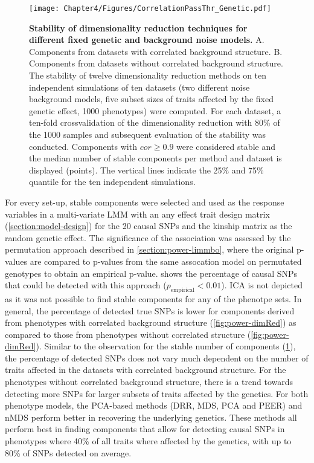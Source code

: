 \begin{figure}[hbtp]
	\centering
	\texttt{[image: Chapter4/Figures/CorrelationPassThr\_Genetic.pdf]}
\caption[\textbf{Stability of dimensionality reduction techniques for different fixed genetic and background noise models.}]{\textbf{Stability of dimensionality reduction techniques for different fixed genetic and background noise models. }A. Components from datasets with correlated background structure. B. Components from datasets without correlated background structure. The stability of twelve dimensionality reduction methods on ten independent simulations of ten datasets (two different noise background models, five subset sizes of traits affected by the fixed genetic effect, \num{1000} phenotypes) were computed.  For each dataset, a ten-fold crossvalidation of the dimensionality reduction with \num{80}\% of the \num{1000} samples and subsequent evaluation of the stability was conducted. Components with \(cor \ge 0.9\) were considered stable and the median number of stable components per method and dataset is displayed (points). The vertical lines indicate the \num{25}\% and \num{75}\% quantile for the ten independent simulations. } 
	 	\label{fig:cor-genetic}
\end{figure}

For every set-up, stable components were selected and used as the response variables in a multi-variate LMM with an any effect trait design matrix (\cref{section:model-design}) for the \num{20} causal SNPs and the kinship matrix as the random genetic effect. The significance of the association was assessed by the permutation approach described in \cref{section:power-limmbo}, where the original p-values are compared to p-values from the same assocation model on permutated genotypes to obtain an empirical p-value.  shows the percentage of causal SNPs that could be detected with this approach (\(p_\text{empirical} < 0.01\)). ICA is not depicted as it was not possible to find stable components for any of the phenotpe sets.  In general, the percentage of detected true SNPs is lower for components derived from phenotypes with correlated background structure (\cref{fig:power-dimRed}) as compared to those from phenotypes without correlated structure (\cref{fig:power-dimRed}). Similar to the observation for the stable number of components (\cref{fig:cor-genetic}), the percentage of detected SNPs does not vary much dependent on the number of traits affected in the datasets with correlated background structure. For the phenotypes without correlated background structure, there is a trend towards detecting more SNPs for larger subsets of traits affected by the genetics. For both phenotype models, the PCA-based methods (DRR, MDS, PCA and PEER) and nMDS perform better in recovering the underlying genetics. These methods all perform best in finding components that allow for detecting causal SNPs in phenotypes where \num{40}\% of all traits where affected by the genetics, with up to \num{80}\% of SNPs detected on average. 

